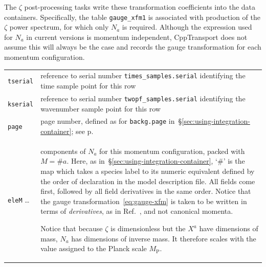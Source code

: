 \documentclass[11pt,a4paper]{article}
\newcommand{\Mp}{M_{\mathrm{P}}}
\newcommand{\packagefont}{\sffamily}
\newcommand{\CppTransport}{{\packagefont CppTransport}}
\newenvironment{sqltablelist}{\renewcommand{\arraystretch}{1.3}\small}{}
\begin{document}
\begin{sqltablelist}
\begin{enumerate}
	The $\zeta$ post-processing tasks write these transformation coefficients into the
	data containers.
	Specifically, the table
	\texttt{gauge_xfm1} is associated with production of the
	$\zeta$ power spectrum,
	for which only $N_a$ is required.
    Although the expression used for $N_a$ in current versions is
    momentum independent, {\CppTransport} does not assume this will always be the
    case and records the gauge transformation for each momentum configuration. \\
    \begin{tabular}{p{2.5cm}p{11.5cm}}
    	\texttt{tserial} & 	reference to serial number \texttt{times_samples.serial}
        identifying the time sample point for this row \\
        \texttt{kserial} & reference to serial number \texttt{twopf_samples.serial}
        identifying the wavenumber sample point for this row \\
        \texttt{page} & page number, defined as for \texttt{backg.page}
        in~\S\ref{sec:using-integration-container}; see p.\pageref{sqltable:backg} \\
        \texttt{eleM} \ldots & components of $N_a$ for this
        momentum configuration, packed with $M= \#a$.
        Here, as in~\S\ref{sec:using-integration-container}, `$\#$'
        is the map which takes a species label to its numeric equivalent
        defined by the order of declaration in the model description file.
        All fields come first, followed by all field derivatives in the same order.
        Notice that
		the gauge transformation~\eqref{eq:gauge-xfm} is taken to be written in
		terms of \emph{derivatives}, as in Ref.~\cite{Dias:2014msa}, and not canonical momenta.
		
		Notice that because $\zeta$ is dimensionless but the $X^a$ have dimensions of
		mass, $N_a$ has dimensions of inverse mass. It therefore scales with the
		value assigned to the Planck scale $\Mp$.
    \end{tabular}
\end{enumerate}
\end{sqltablelist}
\end{document}

